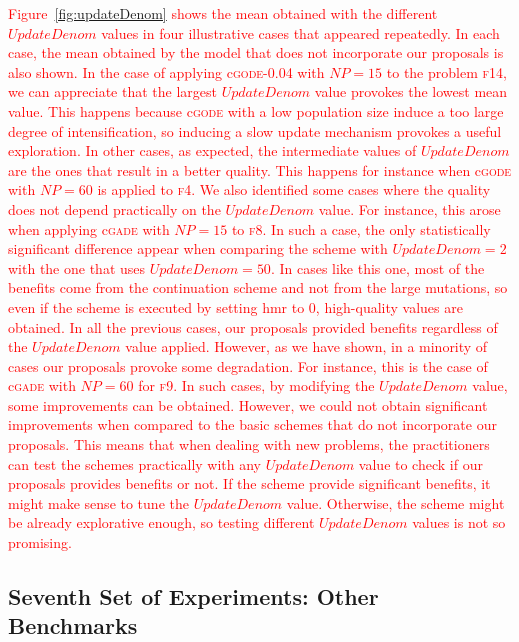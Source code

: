 \documentclass[preprint,3p]{elsarticle}
\newcommand{\HMR}{{\sc hmr}}
\begin{document}
\textcolor{red}{
Figure~\ref{fig:updateDenom} shows the mean obtained with the different $UpdateDenom$ values in four illustrative cases that appeared repeatedly.
%
In each case, the mean obtained by the model that does not incorporate our proposals is also shown.
%
In the case of applying c\textsc{gode-0.04} with $NP = 15$ to the problem \textsc{f14}, we can appreciate that the largest $UpdateDenom$ value provokes
the lowest mean value.
%
This happens because c\textsc{gode} with a low population size induce a too large degree of intensification, so inducing a slow update mechanism provokes a useful exploration.
%
In other cases, as expected, the intermediate values of $UpdateDenom$ are the ones that result in a better quality.
%
This happens for instance when c\textsc{gode} with $NP = 60$ is applied to \textsc{f4}.
%
We also identified some cases where the quality does not depend practically on the $UpdateDenom$ value.
%
For instance, this arose when applying c\textsc{gade} with $NP = 15$ to \textsc{f8}.
%
In such a case, the only statistically significant difference appear when comparing the scheme with $UpdateDenom = 2$ with the one that uses $UpdateDenom = 50$.
%
In cases like this one, most of the benefits come from the continuation scheme and not from the large mutations, so even if the scheme is executed by setting \HMR{} to 0,
high-quality values are obtained.
%
In all the previous cases, our proposals provided benefits regardless of the $UpdateDenom$ value applied.
%
However, as we have shown, in a minority of cases our proposals provoke some degradation.
%
For instance, this is the case of c\textsc{gade} with $NP = 60$ for \textsc{f9}.
%
In such cases, by modifying the $UpdateDenom$ value, some improvements can be obtained.
%
However, we could not obtain significant improvements when compared to the basic schemes that do not incorporate our proposals.
%
This means that when dealing with new problems, the practitioners can test the schemes practically with any $UpdateDenom$ value to check if our proposals
provides benefits or not.
%
If the scheme provide significant benefits, it might make sense to tune the $UpdateDenom$ value.
%
Otherwise, the scheme might be already explorative enough, so testing different $UpdateDenom$ values is not so promising.
}

\subsection{Seventh Set of Experiments: Other Benchmarks}
\end{document}
